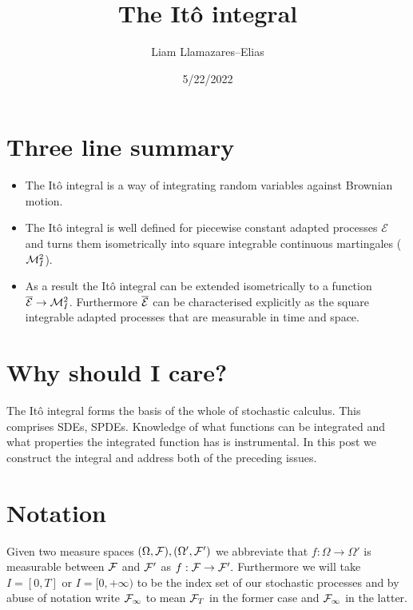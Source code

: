 \documentclass[
    a4paper,
    DIV=14,
    abstract=true,
    numbers=noenddot
]{scrartcl}
\begin{document}
\title{The Itô integral}
\author{Liam Llamazares--Elias}
\date{5/22/2022}
\maketitle
\section{Three line summary}
\begin{itemize}
	\item The Itô integral is a way of integrating random variables against Brownian motion.
	\item The Itô integral is well defined for piecewise constant adapted processes $\mathcal{E}$ and turns them isometrically into square integrable continuous martingales ($\mathcal{M}_I^2$).
	\item As a result the Itô integral can be extended isometrically to a function $\overline{\mathcal{E}}\to \mathcal{M}_I^2$. Furthermore $\overline{\mathcal{E}}$ can be characterised explicitly as the square integrable adapted processes that are measurable in time and space. \end{itemize}
\section{Why should I care?}
The Itô integral forms the basis of the whole of stochastic calculus. This comprises SDEs, SPDEs. Knowledge of what functions can be integrated and what properties the integrated function has is instrumental. In this post we construct the integral and address both of the preceding issues.
\section{Notation}
Given two measure spaces $(\Omega,\mathcal{F}),(\Omega',\mathcal{F}')$ we abbreviate that $f:\Omega\to\Omega'$ is measurable between $\mathcal{F}$ and $\mathcal{F}'$ as
$f:\mathcal{F}\to\mathcal{F}'.$ Furthermore we will take $I=[0,T]$ or $I=[0,+\infty)$ to be the index set of our stochastic processes and by abuse of notation write $\mathcal{F}_\infty$ to mean $\mathcal{F}_T$ in the former case and $\mathcal{F}_\infty$ in the latter.
\end{document}
